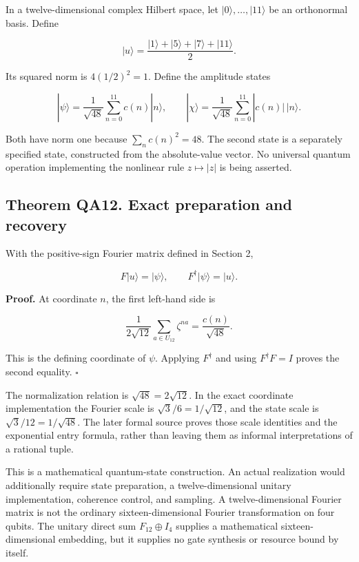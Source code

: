 In a twelve-dimensional complex Hilbert space, let
\(|0\rangle,\ldots,|11\rangle\) be an orthonormal basis. Define

\[
|u\rangle=\frac{|1\rangle+|5\rangle+|7\rangle+|11\rangle}{2}.
\]

Its squared norm is \(4(1/2)^2=1\). Define the amplitude states

\[
|\psi\rangle=\frac1{\sqrt{48}}\sum_{n=0}^{11}c(n)|n\rangle,
\qquad
|\chi\rangle=\frac1{\sqrt{48}}\sum_{n=0}^{11}|c(n)|\,|n\rangle.
\]

Both have norm one because \(\sum_nc(n)^2=48\). The second state is a
separately specified state, constructed from the absolute-value vector.
No universal quantum operation implementing the nonlinear rule
\(z\mapsto|z|\) is being asserted.

\hypertarget{theorem-qa12.-exact-preparation-and-recovery}{%
\subsection*{Theorem QA12. Exact preparation and
recovery}\label{theorem-qa12.-exact-preparation-and-recovery}}

With the positive-sign Fourier matrix defined in Section 2,

\[
\boxed{F|u\rangle=|\psi\rangle,
\qquad F^\dagger|\psi\rangle=|u\rangle.}
\]

\textbf{Proof.} At coordinate \(n\), the first left-hand side is

\[
\frac1{2\sqrt{12}}\sum_{a\in U_{12}}\zeta^{na}
=\frac{c(n)}{\sqrt{48}}.
\]

This is the defining coordinate of \(\psi\). Applying \(F^\dagger\) and
using \(F^\dagger F=I\) proves the second equality. \(\square\)

The normalization relation is \(\sqrt{48}=2\sqrt{12}\). In the exact
coordinate implementation the Fourier scale is \(\sqrt3/6=1/\sqrt{12}\),
and the state scale is \(\sqrt3/12=1/\sqrt{48}\). The later formal
source proves those scale identities and the exponential entry formula,
rather than leaving them as informal interpretations of a rational
tuple.

This is a mathematical quantum-state construction. An actual realization
would additionally require state preparation, a twelve-dimensional
unitary implementation, coherence control, and sampling. A
twelve-dimensional Fourier matrix is not the ordinary
sixteen-dimensional Fourier transformation on four qubits. The unitary
direct sum \(F_{12}\oplus I_4\) supplies a mathematical
sixteen-dimensional embedding, but it supplies no gate synthesis or
resource bound by itself.

